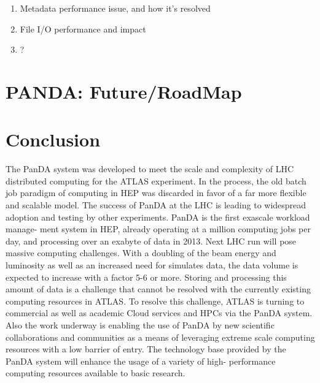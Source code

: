 \documentclass[10pt, conference, compsocconf]{IEEEtran}
\begin{document}
\begin{enumerate}
  \item Metadata performance issue, and how it’s resolved
  \item File I/O performance and impact
  \item ?
\end{enumerate}

\section{PANDA: Future/RoadMap}
\label{sec:panda_roadmap}

 \section{Conclusion}\label{sec:conclusion}
The PanDA  system was developed to meet the scale and complexity of LHC distributed computing for the ATLAS experiment.  In the process,  the old batch job paradigm  of
computing in HEP was  discarded  in favor  of a  far more flexible and scalable  model. The success  of PanDA  at the LHC is leading to widespread adoption and testing by other experiments. PanDA  is the first exascale  workload manage- ment system in HEP, already operating at a million computing jobs per day, and processing over an exabyte of data in 2013. Next LHC run will pose massive computing  challenges. With a  doubling of the beam  energy  and luminosity as  well as an increased  need for  simulates  data, the data volume is expected to increase with a factor 5-6 or more. Storing and processing  this amount of data is a  challenge   that cannot be resolved with the currently existing  computing  resources in ATLAS. To resolve this challenge, ATLAS is turning to commercial  as well as academic Cloud services and HPCs via the PanDA system. Also the work underway is enabling the use of PanDA by new scientific collaborations and communities as a means  of leveraging  extreme scale computing  resources with a low barrier of entry. The technology base provided by the PanDA system will enhance the usage of a variety  of high- performance computing resources available to basic research.





\end{document}
